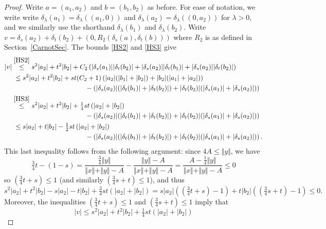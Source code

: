 \documentclass[11pt]{amsart}
\theoremstyle{definition}
\numberwithin{theorem}{section} \numberwithin{equation}{section}
\begin{document}
\begin{proof}
Write $a=(a_1,a_2)$ and $b=(b_1,b_2)$ as before.
For ease of notation, we write write $\delta_{\lambda} (a_1) = \delta_{\lambda} ((a_1,0))$
and $\delta_{\lambda} (a_2) = \delta_{\lambda} ((0,a_2))$ for $\lambda > 0$, 
and we similarly use the shorthand $\delta_{\lambda} (b_1)$ and $\delta_{\lambda} (b_2)$.
Write $v = \delta_{s}(a_2) + \delta_{t}(b_2) + (0,R_2(\delta_{s} (a), \delta_{t}(b)))$ where $R_2$ is as defined in Section~\ref{CarnotSec}.
The bounds \eqref{HS2} and \eqref{HS3} give
\begin{align*}
|v| 
&\stackrel{\eqref{HS2}}{\leq} s^2|a_2|+t^2|b_2| + C_2\left( |\delta_s (a_1)||\delta_{t}(b_2)| + |\delta_s (a_2)||\delta_{t}(b_1)| + |\delta_s (a_2)||\delta_{t}(b_2)|\right) \\
&\;\leq s^2|a_2|+t^2|b_2| + st(C_2+1)\left( |a_2|(|b_1|+|b_2|) + |b_2|(|a_1| + |a_2|) \right) \\
&\hspace{1.5in} - \left( |\delta_s (a_2)|(|\delta_{t}(b_1)|+|\delta_{t}(b_2)|) + |\delta_{t}(b_2)|(|\delta_s (a_1)| + |\delta_s (a_2)|) \right) \\
& \stackrel{\eqref{HS3}}{\leq} s^2|a_2|+t^2|b_2| + \tfrac14 st \left(|a_2|+ |b_2|\right) \\
&\hspace{1.5in} - \left( |\delta_s (a_2)|(|\delta_{t}(b_1)|+|\delta_{t}(b_2)|) + |\delta_{t}(b_2)|(|\delta_s (a_1)| + |\delta_s (a_2)|) \right)\\
& \;\leq  s|a_2|+t|b_2| - \tfrac12 st \left(|a_2|+ |b_2|\right) \\
&\hspace{1.5in} - \left( |\delta_s (a_2)|(|\delta_{t}(b_1)|+|\delta_{t}(b_2)|) + |\delta_{t}(b_2)|(|\delta_s (a_1)| + |\delta_s (a_2)|) \right).
\end{align*}
This last inequality follows from the following argument:
since $4A \leq \Vert y \Vert$, we have 
$$
\tfrac34t - (1-s)
= \frac{\tfrac34 \Vert y \Vert}{\Vert x \Vert + \Vert y \Vert - A} 
- \frac{\Vert y \Vert - A}{\Vert x \Vert + \Vert y \Vert  - A}
= \frac{A-\tfrac14 \Vert y \Vert}{\Vert x \Vert + \Vert y \Vert  - A}
\leq 0
$$
so $(\tfrac34 t +s) \leq 1$ (and similarly $(\tfrac34 s +t) \leq 1$), and thus
$$
s^2|a_2|+t^2|b_2| -s|a_2| - t|b_2| + \tfrac34 st \left(|a_2|+ |b_2|\right) 
= s|a_2|\left((\tfrac34 t +s) - 1\right) + t|b_2|\left((\tfrac34s + t) - 1\right) \leq 0.
$$
Moreover, the inequalities $(\tfrac34 t +s) \leq 1$ and $(\tfrac34 s +t) \leq 1$ imply that
$$
|v| \leq s^2|a_2|+t^2|b_2| + \tfrac14 st \left(|a_2|+ |b_2|\right)
$$
\end{proof}
\end{document}
